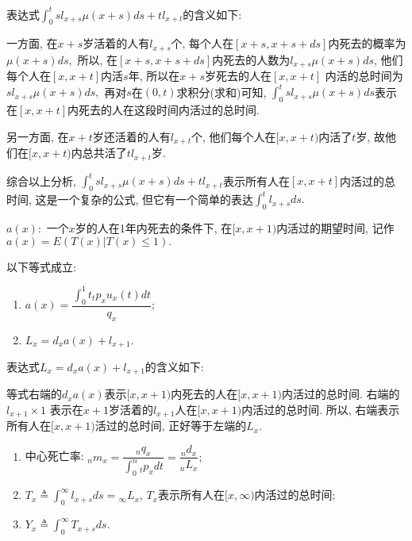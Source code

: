 \documentclass[lang=cn,10pt]{elegantbook}
\begin{document}
\begin{remark}
	表达式$\int_0^tsl_{x+s}\mu(x+s)ds+tl_{x+t}$的含义如下:

	一方面, 在$x+s$岁活着的人有$l_{x+s}$个, 每个人在$[x+s,x+s+ds]$内死去的概率为$\mu(x+s)ds,$ 所以, 在$[x+s,x+s+ds]$内死去的人数为$l_{x+s}\mu(x+s)ds$, 他们每个人在$[x,x+t]$内活$s$年, 所以在$x+s$岁死去的人在$[x,x+t]$ 内活的总时间为$sl_{x+s}\mu(x+s)ds,$ 再对$s$在$(0,t)$求积分(求和)可知, $\int_0^tsl_{x+s}\mu(x+s)ds$表示在$[x,x+t]$内死去的人在这段时间内活过的总时间. 
	
	另一方面, 在$x+t$岁还活着的人有$l_{x+t}$个, 他们每个人在$[x,x+t)$内活了$t$岁, 故他们在$[x,x+t)$内总共活了$tl_{x+t}$岁.

	综合以上分析, $\int_0^tsl_{x+s}\mu(x+s)ds+tl_{x+t}$表示所有人在$[x,x+t]$内活过的总时间, 这是一个复杂的公式, 但它有一个简单的表达$\int_0^tl_{x+s}ds.$
\end{remark}

\begin{definition}
	$a(x):$ 一个$x$岁的人在1年内死去的条件下, 在$[x,x+1)$内活过的期望时间, 记作$a(x)=E(T(x)|T(x)\leq 1).$
\end{definition}

\begin{corollary}以下等式成立:
    \begin{enumerate}
		\item $a(x)=\dfrac {\int_0^1t{}_tp_xu_x(t)dt}{q_x};$
		\item $L_x=d_xa(x)+l_{x+1}.$
	\end{enumerate} 
\end{corollary}

\begin{remark}
	表达式$L_x=d_xa(x)+l_{x+1}$的含义如下:
   
	等式右端的$d_xa(x)$表示$[x,x+1)$内死去的人在$[x,x+1)$内活过的总时间. 右端的$l_{x+1}\times1$ 表示在$x+1$岁活着的$l_{x+1}$人在$[x,x+1)$内活过的总时间. 所以, 右端表示所有人在$[x,x+1)$活过的总时间, 正好等于左端的$L_x.$
   \end{remark}

\begin{proposition}
	\begin{enumerate}
		\item 中心死亡率: ${}_nm_x=\dfrac {{}_nq_x}{\int_0^n{}_tp_xdt}=\dfrac{{}_nd_x}{{}_nL_x};$
		\item $T_x\triangleq\int_0^{\infty}l_{x+s}ds={}_{\infty}L_x$, $T_x$表示所有人在$[x,\infty)$内活过的总时间; 
		\item $Y_x\triangleq\int_0^{\infty}T_{x+s}ds.$
	\end{enumerate}
\end{proposition}
\end{document}
